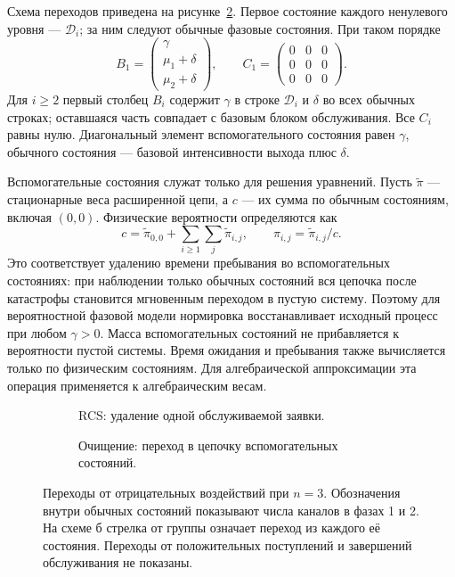 Схема переходов приведена на рисунке~\ref{fig:disaster_transitions}. Первое состояние каждого ненулевого уровня --- \(\mathcal{D}_i\); за ним следуют обычные фазовые состояния. При таком порядке
\[
B_1=\begin{pmatrix}\gamma\\\mu_1+\delta\\\mu_2+\delta\end{pmatrix},\qquad
C_1=\begin{pmatrix}0&0&0\\0&0&0\\0&0&0\end{pmatrix}.
\]
Для \(i\ge2\) первый столбец \(B_i\) содержит \(\gamma\) в строке \(\mathcal{D}_i\) и \(\delta\) во всех обычных строках; оставшаяся часть совпадает с базовым блоком обслуживания. Все \(C_i\) равны нулю. Диагональный элемент вспомогательного состояния равен \(\gamma\), обычного состояния --- базовой интенсивности выхода плюс \(\delta\).

Вспомогательные состояния служат только для решения уравнений. Пусть \(\widetilde\pi\) --- стационарные веса расширенной цепи, а \(c\) --- их сумма по обычным состояниям, включая \((0,0)\). Физические вероятности определяются как
\[
c=\widetilde\pi_{0,0}+\sum_{i\ge1}\sum_j\widetilde\pi_{i,j},\qquad
\pi_{i,j}=\widetilde\pi_{i,j}/c.
\]
Это соответствует удалению времени пребывания во вспомогательных состояниях: при наблюдении только обычных состояний вся цепочка после катастрофы становится мгновенным переходом в пустую систему. Поэтому для вероятностной фазовой модели нормировка восстанавливает исходный процесс при любом \(\gamma>0\). Масса вспомогательных состояний не прибавляется к вероятности пустой системы. Время ожидания и пребывания также вычисляется только по физическим состояниям. Для алгебраической аппроксимации эта операция применяется к алгебраическим весам.

\begin{figure}[!htbp]
\centering
\begin{subfigure}[t]{0.98\linewidth}
\centering
{}
\caption{RCS: удаление одной обслуживаемой заявки.}
\label{fig:rcs_transitions}
\end{subfigure}

\begin{subfigure}[t]{0.98\linewidth}
\centering
{}
\caption{Очищение: переход в цепочку вспомогательных состояний.}
\label{fig:disaster_transitions}
\end{subfigure}
\caption{Переходы от отрицательных воздействий при \(n=3\). Обозначения внутри обычных состояний показывают числа каналов в фазах 1 и 2. На схеме б стрелка от группы означает переход из каждого её состояния. Переходы от положительных поступлений и завершений обслуживания не показаны.}
\label{fig:negative_transitions}
\end{figure}

